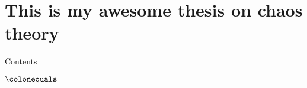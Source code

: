 \documentclass[11pt]{article}
\begin{document}
\section{This is my awesome thesis on chaos theory}
Contents\cite{Ott}\cite{Abarbanel}\cite{Eckmann}\cite{Devaney}

$\colonequals$



\end{document}
